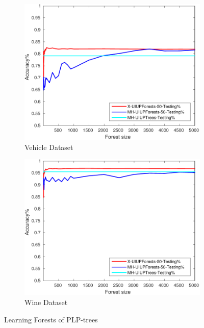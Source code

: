 \begin{figure}[ht]
\begin{subfigure}[b]{0.3\textwidth}
  	\includegraphics[width=\textwidth]{figs/PLPTF/Forests/VehicleDownsampledFurther_Forests_X_MH.pdf}
  	\caption{Vehicle Dataset}
		\label{fig:V3}
	\end{subfigure}
  \begin{subfigure}[b]{0.3\textwidth}
		\centering
  	\includegraphics[width=\textwidth]{figs/PLPTF/Forests/WineDownsampled_Forests_X_MH.pdf}
  	\caption{Wine Dataset}
		\label{fig:W3}
	\end{subfigure}

  \caption{Learning Forests of PLP-trees}
  \label{fig:forests1}
\end{figure}

